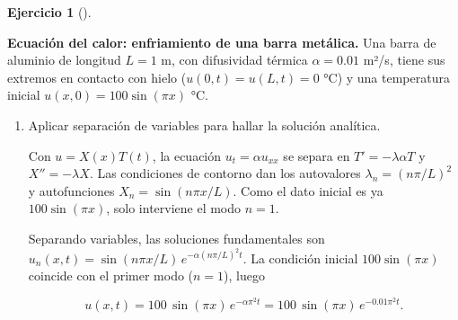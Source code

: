 \documentclass[
  spanish,
  a4paper,
]{scrreport}
\theoremstyle{definition}
\newtheorem{exercise}{Ejercicio}[chapter]
\theoremstyle{remark}
\begin{document}
\begin{exercise}[]\protect\hypertarget{exr-calor-barra}{}\label{exr-calor-barra}

\textbf{Ecuación del calor: enfriamiento de una barra metálica.} Una
barra de aluminio de longitud \(L = 1\) m, con difusividad térmica
\(\alpha = 0.01\) m²/s, tiene sus extremos en contacto con hielo
(\(u(0,t) = u(L,t) = 0\) °C) y una temperatura inicial
\(u(x, 0) = 100\sin(\pi x)\) °C.

\begin{enumerate}
\def\labelenumi{\alph{enumi}.}
\item
  Aplicar separación de variables para hallar la solución analítica.

  \begin{tcolorbox}[enhanced jigsaw, arc=.35mm, bottomrule=.15mm, bottomtitle=1mm, breakable, colback=white, colbacktitle=quarto-callout-note-color!10!white, colframe=quarto-callout-note-color-frame, coltitle=black, left=2mm, leftrule=.75mm, opacityback=0, opacitybacktitle=0.6, rightrule=.15mm, title=\textcolor{quarto-callout-note-color}{\faInfo}\hspace{0.5em}{Ayuda}, titlerule=0mm, toprule=.15mm, toptitle=1mm]

  Con \(u = X(x)T(t)\), la ecuación \(u_t = \alpha u_{xx}\) se separa en
  \(T' = -\lambda\alpha T\) y \(X'' = -\lambda X\). Las condiciones de
  contorno dan los autovalores \(\lambda_n = (n\pi/L)^2\) y
  autofunciones \(X_n = \sin(n\pi x/L)\). Como el dato inicial es ya
  \(100\sin(\pi x)\), solo interviene el modo \(n = 1\).

  \end{tcolorbox}

  \begin{tcolorbox}[enhanced jigsaw, arc=.35mm, bottomrule=.15mm, bottomtitle=1mm, breakable, colback=white, colbacktitle=quarto-callout-tip-color!10!white, colframe=quarto-callout-tip-color-frame, coltitle=black, left=2mm, leftrule=.75mm, opacityback=0, opacitybacktitle=0.6, rightrule=.15mm, title=\textcolor{quarto-callout-tip-color}{\faLightbulb}\hspace{0.5em}{Solución}, titlerule=0mm, toprule=.15mm, toptitle=1mm]

  Separando variables, las soluciones fundamentales son
  \(u_n(x,t) = \sin(n\pi x/L)\,e^{-\alpha (n\pi/L)^2 t}\). La condición
  inicial \(100\sin(\pi x)\) coincide con el primer modo (\(n = 1\)),
  luego

  \[
  u(x, t) = 100\,\sin(\pi x)\,e^{-\alpha \pi^2 t} = 100\,\sin(\pi x)\,e^{-0.01\pi^2 t}.
  \]


\end{tcolorbox}
\end{enumerate}
\end{exercise}
\end{document}
